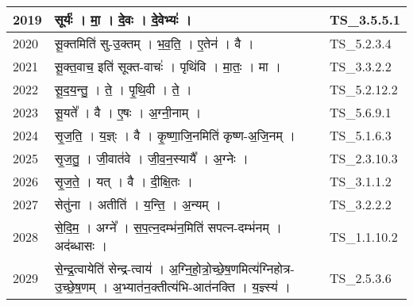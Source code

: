 \documentclass[17pt]{extarticle}
\begin{document}
\begin{longtable}{||p{0.4in}||p{4.9in}||p{0.9in}||}
    2019 & सूर्यः॑   ।   मा॒   ।   दे॒वः   ।   दे॒वेभ्यः॑   ।    & TS\_3.5.5.1       \\
    
    \hline
        
    2020 & सू॒क्तमिति॑ सु{-}उ॒क्तम्   ।   भ॒व॒ति॒   ।   ए॒तेन॑   ।   वै   ।    & TS\_5.2.3.4       \\
    
    \hline
        
    2021 & सू॒क्त॒वाच॒ इति॑ सूक्त{-}वाचः॑   ।   पृथि॑वि   ।   मा॒तः॒   ।   मा   ।    & TS\_3.3.2.2       \\
    
    \hline
        
    2022 & सू॒द॒य॒न्तु॒   ।   ते॒   ।   पृ॒थि॒वी   ।   ते॒   ।    & TS\_5.2.12.2       \\
    
    \hline
        
    2023 & सू॒यते᳚   ।   वै   ।   ए॒षः   ।   अ॒ग्नी॒नाम्   ।    & TS\_5.6.9.1       \\
    
    \hline
        
    2024 & सृ॒ज॒ति॒   ।   य॒ज्ञ्ः   ।   वै   ।   कृ॒ष्णा॒जि॒नमिति॑ कृष्ण{-}अ॒जि॒नम्   ।    & TS\_5.1.6.3       \\
    
    \hline
        
    2025 & सृ॒ज॒तु॒   ।   जी॒वात॑वे   ।   जी॒व॒न॒स्यायै᳚   ।   अ॒ग्नेः   ।    & TS\_2.3.10.3       \\
    
    \hline
        
    2026 & सृ॒ज॒ते॒   ।   यत्   ।   वै   ।   दी॒क्षि॒तः   ।    & TS\_3.1.1.2       \\
    
    \hline
        
    2027 & सेतु॑ना   ।   अतीति॑   ।   य॒न्ति॒   ।   अ॒न्यम्   ।    & TS\_3.2.2.2       \\
    
    \hline
        
    2028 & से॒दि॒म॒   ।   अग्ने᳚   ।   स॒प॒त्न॒दम्भ॑न॒मिति॑ सपत्न{-}दम्भ॑नम्   ।   अद॑ब्धासः   ।    & TS\_1.1.10.2       \\
    
    \hline
        
    2029 & से॒न्द्र॒त्वायेति॑ सेन्द्र{-}त्वाय॑   ।   अ॒ग्नि॒हो॒त्रो॒च्छे॒ष॒णमित्य॑ग्निहोत्र{-}उ॒च्छे॒ष॒णम्   ।   अ॒भ्यात॑न॒क्तीत्य॑भि{-}आत॑नक्ति   ।   य॒ज्ञ्स्य॑   ।    & TS\_2.5.3.6       \\
    

\end{longtable}
\end{document}
